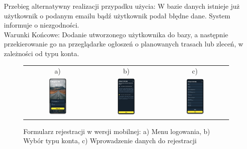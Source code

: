 Przebieg alternatywny realizacji przypadku użycia: W bazie danych istnieje już użytkownik o podanym emailu bądź użytkownik podał błędne dane. System informuje o niezgodności. \\
Warunki Końcowe: Dodanie utworzonego użytkownika do bazy, a następnie przekierowanie go na przeglądarke ogłoszeń o planowanych trasach lub zleceń, w zależności od typu konta.
\begin{figure}[H]
 \centering
  \begin{tabular}{@{}ccc@{}}
  a) & b) & c)\\
  \includegraphics[width=0.3\textwidth]{rozdzial1/logowanie_m.png} &
  \includegraphics[width=0.3\textwidth]{rozdzial1/wybor_1_m.png} &
  \includegraphics[width=0.3\textwidth]{rozdzial1/rejestracja_m.png}
  \end{tabular}
 \caption{Formularz rejestracji w wersji mobilnej: a) Menu logowania, b) Wybór typu konta, c) Wprowadzenie danych do rejestracji}
 \label{fig:Formularz rejestracji - abc - mobile}
\end{figure}
